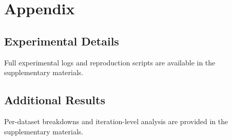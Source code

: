 \section{Appendix}
\label{sec:appendix}


\subsection{Experimental Details}

Full experimental logs and reproduction scripts are available in the supplementary materials.

\subsection{Additional Results}

Per-dataset breakdowns and iteration-level analysis are provided in the supplementary materials.
